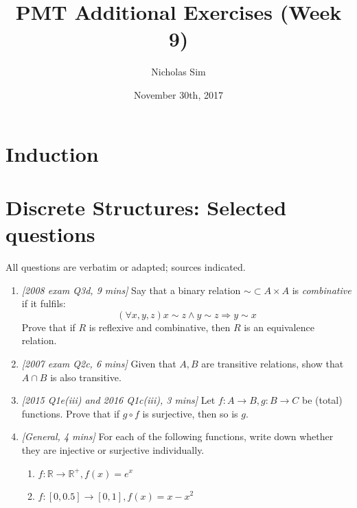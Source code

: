 \documentclass[10pt,a4paper]{article}
\begin{document}
\title{PMT Additional Exercises (Week 9)}
\author{Nicholas Sim}
\date{November 30th, 2017}
\maketitle{}


\section{Induction}

\section{Discrete Structures: Selected questions}
All questions are verbatim or adapted; sources indicated.

\begin{enumerate}
    \item \emph{[2008 exam Q3d, 9 mins]}
    Say that a binary relation \(\sim \subset A \times A \)  is \emph{combinative} if it fulfils:
    \[ (\forall x, y, z) x \sim z \land y \sim z \Rightarrow y \sim x \]
    Prove that if \(R\) is reflexive and combinative, then \(R\) is an equivalence relation.

    \item \emph{[2007 exam Q2c, 6 mins]}
    Given that \(A, B\) are transitive relations, show that \( A \cap B \) is also transitive.

    \item \emph{[2015 Q1e(iii) and 2016 Q1c(iii), 3 mins]}
    Let \(f: A \rightarrow B, g : B \rightarrow C\) be (total) functions.
    Prove that if \(g \circ f\) is surjective, then so is \(g\).

    \item \emph{[General, 4 mins]}
    For each of the following functions, write down whether they are injective or surjective individually.
    \begin{enumerate}
        \item \( f : \mathbb{R} \rightarrow \mathbb{R}^+, f(x) = e^x \)
        \item \( f : [0, 0.5] \rightarrow [0, 1], f(x) = x - x^2 \)
    \end{enumerate}
\end{enumerate}
\end{document}
